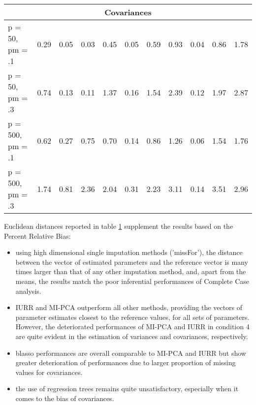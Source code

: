\begin{table}[h]
{\begin{minipage}{\textwidth}
\begin{tabular}{lcccccccccc}
  \multicolumn{11}{c}{\textbf{Covariances}} \\
 \hline
  p = 50, pm = .1 & 0.29 & 0.05 & 0.03 & 0.45 & 0.05 & 0.59 & 0.93 & 0.04 & 0.86 & 1.78 \\ 
  p = 50, pm = .3 & 0.74 & 0.13 & 0.11 & 1.37 & 0.16 & 1.54 & 2.39 & 0.12 & 1.97 & 2.87 \\ 
  p = 500, pm = .1 & 0.62 & 0.27 & 0.75 & 0.70 & 0.14 & 0.86 & 1.26 & 0.06 & 1.54 & 1.76 \\ 
  p = 500, pm = .3 & 1.74 & 0.81 & 2.36 & 2.04 & 0.31 & 2.23 & 3.11 & 0.14 & 3.51 & 2.96 \\  
 \hline

 \end{tabular}
 \label{table:exp1_conds} 
 \end{minipage}}

\end{table}


Euclidean distances reported in table \ref{table:exp1_conds} supplement 
the results based on the Percent Relative Bias:
\begin{itemize}
	\item using high dimensional single imputation methods ('missFor'), the distance between the vector of estimated 
	parameters and the reference vector is many times larger than that of any other imputation method, and, apart from 
	the means, the results match the poor inferential performances of Complete Case analysis.
	\item IURR and MI-PCA outperform all other methods, providing the vectors of parameter estimates 
	closest to the reference values, for all sets of parameters. However, the deteriorated performances of MI-PCA
	and IURR in condition 4 are quite evident in the estimation of variances and covariances, respectively.
	\item blasso performances are overall comparable to MI-PCA and IURR but show greater deterioration of performances 
	due to larger proportion of missing values for covariances.
\iffalse %
	However, in condition 4, the euclidean distance 
	between the reference vector of covariances and the IURR vector of estimates is twice the ED between the MI-PCA
	vector of estimates and the reference.
\fi
	\item the use of regression trees remains quite unsatisfactory, especially when it comes to the bias of covariances.
\end{itemize}

